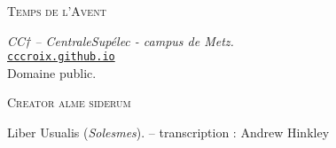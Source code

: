 \documentclass[11pt,a4paper,oneside,BCOR=0cm,DIV=14]{scrartcl}
\begin{document}
\begin{center}
    \Huge \textsc{Temps de l'Avent}

    \vspace{0.4cm}

    {\normalsize \small
        \emph{CC† -- CentraleSupélec - campus de Metz.}\\
        \href{http://cccroix.github.io}{\texttt{cccroix.github.io}}\\
        Domaine public.
    }
\end{center}

\vspace{1cm}

{\textsc{\sc Creator alme siderum}}


{\flushright Liber Usualis (\emph{Solesmes}). \small-- transcription : Andrew Hinkley\\}

\end{document}
